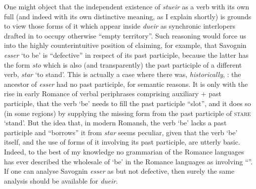 \documentclass[output=paper,
modfonts
]{LSP/langsci}
\begin{document}
One might object that the independent existence of \emph{stueir} as a
verb with its own full  (and indeed with its own distinctive
meaning, as I explain shortly) is grounds to view those forms of it
which appear inside \emph{dueir} as synchronic interlopers drafted in to
occupy otherwise ``empty territory''. Such reasoning would force us into
the highly counterintuitive position of claiming, for example, that
Savognin \emph{esser} `to be' is ``defective'' in respect of its past
participle, because the latter has the form \emph{sto} which is also
(and transparently) the past participle of a different verb, \emph{star}
`to stand'. This is actually a case where there was,
\emph{historically}, : the  ancestor of \emph{esser}
had no past participle, for semantic reasons. It is only with the rise
in early Romance of verbal periphrases comprising auxiliary + past
participle, that the verb `be' needs to fill the past participle ``slot'',
and it does so (in some regions) by supplying the missing form from the
past participle of \textsc{stare} `stand'. But the idea that, in modern
Romansh, the verb `be' lacks a past participle and ``borrows'' it from
\emph{star} seems peculiar, given that the verb `be' itself, and the use
of forms of it involving its past participle, are utterly basic. Indeed,
to the best of my knowledge no grammarian of the Romance languages has
ever described the wholesale  of `be' in the Romance languages
as involving ``''. If one can analyse Savognin \emph{esser}
as  but not defective, then surely the same analysis should be
available for \emph{dueir}.
\end{document}
